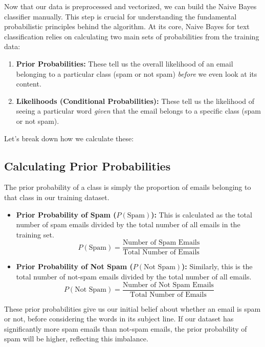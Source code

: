 \documentclass[12pt,letterpaper]{article}
\begin{document}
Now that our data is preprocessed and vectorized, we can build the Naive Bayes classifier manually. This step is crucial for understanding the fundamental probabilistic principles behind the algorithm. At its core, Naive Bayes for text classification relies on calculating two main sets of probabilities from the training data:

\begin{enumerate}
    \item \textbf{Prior Probabilities:} These tell us the overall likelihood of an email belonging to a particular class (spam or not spam) \textit{before} we even look at its content.
    \item \textbf{Likelihoods (Conditional Probabilities):} These tell us the likelihood of seeing a particular word \textit{given} that the email belongs to a specific class (spam or not spam).
\end{enumerate}

Let's break down how we calculate these:

\subsection{Calculating Prior Probabilities}

The prior probability of a class is simply the proportion of emails belonging to that class in our training dataset.

\begin{itemize}
    \item \textbf{Prior Probability of Spam ($P(\text{Spam})$):} This is calculated as the total number of spam emails divided by the total number of all emails in the training set.
    \begin{equation}
    P(\text{Spam}) = \frac{\text{Number of Spam Emails}}{\text{Total Number of Emails}}
    \end{equation}
    
    \item \textbf{Prior Probability of Not Spam ($P(\text{Not Spam})$):} Similarly, this is the total number of not-spam emails divided by the total number of all emails.
    \begin{equation}
    P(\text{Not Spam}) = \frac{\text{Number of Not Spam Emails}}{\text{Total Number of Emails}}
    \end{equation}
\end{itemize}

These prior probabilities give us our initial belief about whether an email is spam or not, before considering the words in its subject line. If our dataset has significantly more spam emails than not-spam emails, the prior probability of spam will be higher, reflecting this imbalance.
\end{document}
